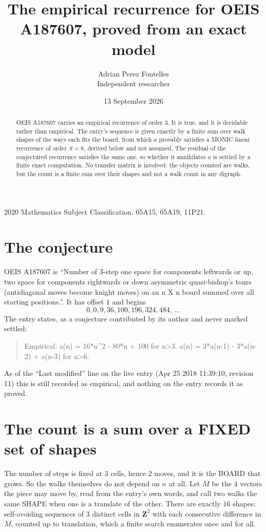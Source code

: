 \documentclass[11pt,a4paper]{article}
\title{The empirical recurrence for OEIS A187607, proved from an exact model}
\author{Adrian Perez Fontelles\\ \small Independent researcher}
\date{13 September 2026}
\theoremstyle{plain}
\theoremstyle{definition}
\begin{document}
\maketitle

\begin{abstract}
OEIS A187607 carries an empirical recurrence of order $3$. It is true, and it is
decidable rather than empirical. The entry's sequence is given exactly by a finite sum over walk shapes of the ways each fits the board, from
which $a$ provably satisfies a MONIC linear recurrence of order $S=8$, derived below and not
assumed. The residual of the conjectured recurrence satisfies the same one, so whether it
annihilates $a$ is settled by a finite exact computation. No transfer matrix is involved: the objects counted are walks, but the count is a finite sum over their shapes and not a walk count in any digraph.
\end{abstract}

\noindent\small 2020 Mathematics Subject Classification. 05A15, 05A19, 11P21.\normalsize

\section{The conjecture}

OEIS A187607 is ``Number of 3-step one space for components leftwards or up, two space for components rightwards or down asymmetric quasi-bishop's tours (antidiagonal moves become knight moves) on an n X n board summed over all starting positions.''. It has offset $1$ and begins
\[
0, 0, 9, 36, 100, 196, 324, 484,\ \dots
\]
The entry states, as a conjecture contributed by its author and never marked settled:
\begin{quote}
Empirical: a(n) = 16*n\^{}2 - 80*n + 100 for n>3. a(n) = 3*a(n-1) - 3*a(n-2) + a(n-3) for n>6.
\end{quote}
As of the ``Last modified'' line on the live entry (Apr 25 2018 11:39:10, revision 11)
this is still recorded as empirical, and nothing on the entry records it as proved.

\section{The count is a sum over a FIXED set of shapes}

The number of steps is fixed at $3$ cells, hence $2$ moves, and it is the BOARD
that grows. So the walks themselves do not depend on $n$ at all. Let $M$ be the $4$
vectors the piece may move by, read from the entry's own words, and call two walks the same
SHAPE when one is a translate of the other. There are exactly $16$ shapes: self-avoiding
sequences of $3$ distinct cells in $\mathbf{Z}^{2}$ with each consecutive difference in
$M$, counted up to translation, which a finite search enumerates once and for all.
\end{document}

